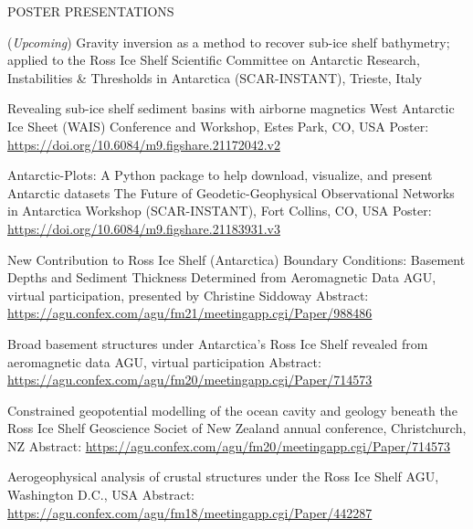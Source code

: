 \documentclass{ExpressiveResume}
\begin{document}
\noindent POSTER PRESENTATIONS \newline

\begin{cventries}

    {(\textit{Upcoming}) Gravity inversion as a method to recover sub-ice shelf bathymetry; applied to the Ross Ice Shelf}
    {Scientific Committee on Antarctic Research, Instabilities \&
        Thresholds in Antarctica (SCAR-INSTANT), Trieste, Italy}
    {}
    {}




    {Revealing sub-ice shelf sediment basins with airborne magnetics}
    {West Antarctic Ice Sheet (WAIS) Conference and Workshop, Estes Park, CO, USA}
    {Poster: \url{https://doi.org/10.6084/m9.figshare.21172042.v2}}
    {}
    {}

    \talk{} %
    {Antarctic-Plots: A Python package to help download, visualize, and present Antarctic datasets}
    {The Future of Geodetic-Geophysical Observational Networks in
        Antarctica Workshop (SCAR-INSTANT), Fort Collins, CO, USA}
    {Poster: \url{https://doi.org/10.6084/m9.figshare.21183931.v3}}
    {}
    {}

    {New Contribution to Ross Ice Shelf (Antarctica) Boundary Conditions: Basement Depths and Sediment Thickness Determined from Aeromagnetic Data}
    {AGU, virtual participation, presented by Christine Siddoway}
    {Abstract: \url{https://agu.confex.com/agu/fm21/meetingapp.cgi/Paper/988486}}
    {}
    {}

    {Broad basement structures under Antarctica’s Ross Ice Shelf revealed from aeromagnetic data}
    {AGU, virtual participation}
    {Abstract: \url{https://agu.confex.com/agu/fm20/meetingapp.cgi/Paper/714573}}
    {}
    {}

    \talk{} %
    {Constrained geopotential modelling of the ocean cavity and geology beneath the Ross Ice Shelf}
    {Geoscience Societ of New Zealand annual conference, Christchurch, NZ}
    {Abstract: \url{https://agu.confex.com/agu/fm20/meetingapp.cgi/Paper/714573}}
    {}
    {}

    {Aerogeophysical analysis of crustal structures under the Ross Ice Shelf}
    {AGU, Washington D.C., USA}
    {Abstract: \url{https://agu.confex.com/agu/fm18/meetingapp.cgi/Paper/442287}}
    {}
    {}

\end{cventries}
\end{document}
